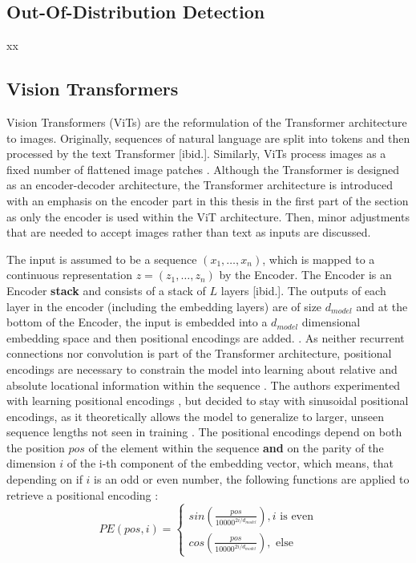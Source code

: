 \subsection{Out-Of-Distribution Detection}
xx
\subsection{Vision Transformers}
\label{section: Vision Transformers}
Vision Transformers (ViTs) are the reformulation of the Transformer architecture \cite{Vaswani2017} to images.
Originally, sequences of natural language are split into tokens and then processed by the text Transformer [ibid.].  
Similarly, ViTs process images as a fixed number of flattened image patches \citep{Dosovitskiy2020}.
Although the Transformer is designed as an encoder-decoder architecture, the Transformer architecture is introduced with an emphasis on the encoder part in this thesis in the first part of the section as only the encoder is used within the ViT architecture.
Then, minor adjustments that are needed to accept images rather than text as inputs are discussed.
\par
The input is assumed to be a sequence $(x_1,\dots,x_n)$, which is mapped to a continuous representation $z=(z_1,\dots,z_n)$ by the Encoder\citep{Vaswani2017}.
The Encoder is an Encoder \textbf{stack} and consists of a stack of $L$ layers [ibid.].
The outputs of each layer in the encoder (including the embedding layers) are of size $d_{model}$ and at the bottom of the Encoder, the input is embedded into a $d_{model}$ dimensional embedding space and then positional encodings are added. \citep{Vaswani2017}.
As neither recurrent connections nor convolution is part of the Transformer architecture, positional encodings are necessary to constrain the model into learning about relative and absolute locational information within the sequence \citep{Vaswani2017}.
The authors experimented with learning positional encodings \citep{Gehring2018}, but decided to stay with sinusoidal positional encodings, as it theoretically allows the model to generalize to larger, unseen sequence lengths not seen in training \citep{Vaswani2017}.
The positional encodings depend on both the position $pos$ of the element within the sequence \textbf{and} on the parity of the dimension $i$ of the i-th component of the embedding vector, which means, that depending on if $i$ is an odd or even number, the following functions are applied to retrieve a positional encoding \citep{Vaswani2017}:
\begin{equation}
	PE(pos, i) = 
	\begin{cases}
		sin(\frac{pos}{10000^{2i / d_{model}}}), i \text{ is even} \\
		cos(\frac{pos}{10000^{2i / d_{model}}}), \text{ else}
	\end{cases}
	\label{equation:positional-encoding}
\end{equation}
